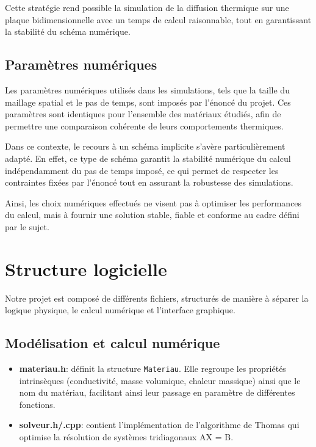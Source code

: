 \documentclass[a4paper,12pt]{article}
\begin{document}
Cette stratégie rend possible la simulation de la diffusion thermique sur une plaque bidimensionnelle avec un temps de calcul raisonnable, tout en garantissant la stabilité du schéma numérique.

\subsection{Paramètres numériques }

Les paramètres numériques utilisés dans les simulations, tels que la taille du maillage spatial et le pas de temps, sont imposés par l’énoncé du projet. Ces paramètres sont identiques pour l’ensemble des matériaux étudiés, afin de permettre une comparaison cohérente de leurs comportements thermiques.

Dans ce contexte, le recours à un schéma implicite s’avère particulièrement adapté. En effet, ce type de schéma garantit la stabilité numérique du calcul indépendamment du pas de temps imposé, ce qui permet de respecter les contraintes fixées par l’énoncé tout en assurant la robustesse des simulations.

Ainsi, les choix numériques effectués ne visent pas à optimiser les performances du calcul, mais à fournir une solution stable, fiable et conforme au cadre défini par le sujet.

\section{Structure logicielle}

Notre projet est composé de différents fichiers, structurés de manière à séparer la logique physique, le calcul numérique et l'interface graphique.

\subsection{Modélisation et calcul numérique}

\begin{itemize}
    \item \textbf{materiau.h}: définit la structure \texttt{Materiau}. Elle regroupe les propriétés intrinsèques (conductivité, masse volumique, chaleur massique) ainsi que le nom du matériau, facilitant ainsi leur passage en paramètre de différentes fonctions.
    \item \textbf{solveur.h/.cpp}: contient l'implémentation de l'algorithme de Thomas qui optimise la résolution de systèmes tridiagonaux AX = B. 
\end{itemize}
\end{document}
